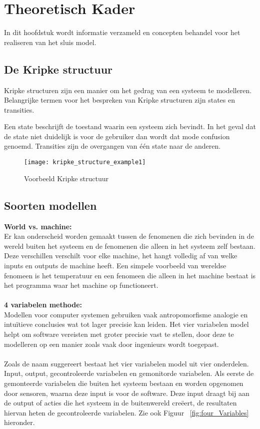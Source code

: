 \section{Theoretisch Kader}
In dit hoofdstuk wordt informatie verzameld en concepten behandel voor het realiseren van het sluis model.

\subsection{De Kripke structuur}

Kripke structuren zijn een manier om het gedrag van een systeem te modelleren. Belangrijke termen voor het bespreken van Kripke structuren zijn states en transities. \newline

Een state beschrijft de toestand waarin een systeem zich bevindt. In het geval dat de state niet duidelijk is voor de gebruiker dan wordt dat mode confusion genoemd. Transities zijn de overgangen van één state naar de anderen. 

\begin{figure}[!h]
	\centering
	\texttt{[image: kripke\_structure\_example1]}
    \caption{Voorbeeld Kripke structuur}
\end{figure}

\subsection{Soorten modellen} \label{SoortenModellen}

\textbf{World vs. machine:} 
\\
Er kan onderscheid worden gemaakt tussen de fenomenen die zich bevinden in de wereld buiten het systeem en de fenomenen die alleen in het systeem zelf bestaan. Deze verschillen verschilt voor elke machine, het hangt volledig af van welke inputs en outputs de machine heeft. Een simpele voorbeeld van wereldse fenomeen is het temperatuur en een fenomeen die alleen in het machine bestaat is het programma waar het machine op functioneert. \\\\
\textbf{4 variabelen methode:}
\\
Modellen voor computer systemen gebruiken vaak antropomorfisme analogie en intuïtieve conclusies wat tot lager precisie kan leiden. Het vier variabelen model helpt om software vereisten met groter precisie vast te stellen, door deze te modelleren op een manier zoals vaak door ingenieurs wordt toegepast. \cite{parnas1995functional} 
\\\\
Zoals de naam suggereert bestaat het vier variabelen model uit vier onderdelen. Input, output, gecontroleerde variabelen en gemonitorde variabelen. Als eerste de gemonteerde variabelen die buiten het systeem bestaan en worden opgenomen door sensoren, waarna deze input is voor de software. Deze input draagt bij aan de output of acties die het systeem in de buitenwereld creëert, de resultaten hiervan heten de gecontroleerde variabelen. Zie ook Figuur ~\ref{fig:four_Variables} hieronder.


